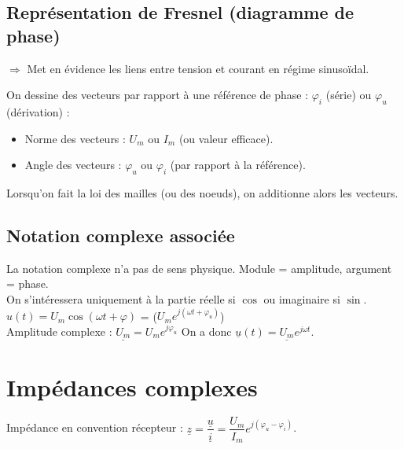 \documentclass[13pt, twoside, a4paper, french]{report}
\begin{document}
    \subsection{Représentation de Fresnel (diagramme de phase)}\label{subsec:representation-de-fresnel-(diagramme-de-phase)}

    $\Rightarrow$ Met en évidence les liens entre tension et courant en régime sinusoïdal.

    \vspace{5pt}
    On dessine des vecteurs par rapport à une référence de phase : $\varphi_i$ (série) ou $\varphi_u$ (dérivation) :
    \begin{itemize}
        \item Norme des vecteurs : $U_m$ ou $I_m$ (ou valeur efficace).
        \item Angle des vecteurs : $\varphi_u$ ou $\varphi_i$ (par rapport à la référence).
    \end{itemize}
    \vspace{5pt}
    Lorsqu'on fait la loi des mailles (ou des noeuds), on additionne alors les vecteurs.

    \subsection{Notation complexe associée}\label{subsec:notation-complexe-associée}

    La notation complexe n'a pas de sens physique.
    Module = amplitude, argument = phase.\\
    On s'intéressera uniquement à la partie réelle si $\cos$ ou imaginaire si $\sin$.\\

    $u(t) = U_m \cos(\omega t + \varphi)$ = \Re($U_m e^{j(\omega t + \varphi_u)}$)\\

    Amplitude complexe : $\underline{U_m} = U_m e^{j\varphi_u}$ \quad On a donc $\underline{u}(t) = \underline{U_m} e^{j\omega t}$.


    \section{Impédances complexes}\label{sec:impedances-complexes}

    Impédance en convention récepteur : $\underline{z} = \dfrac{\underline{u}}{\underline{i}} = \dfrac{U_m}{I_m} e^{j(\varphi_u - \varphi_i)}$.\\
\end{document}
